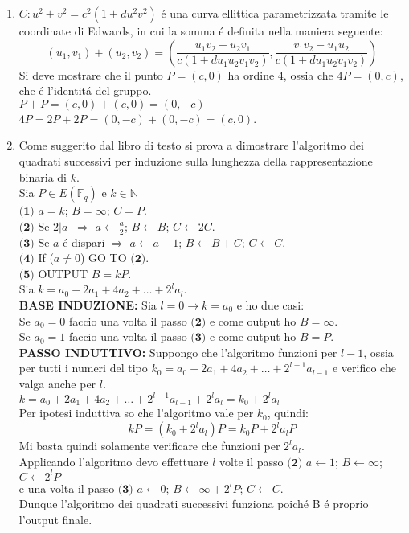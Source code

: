 \documentclass[a4paper]{article}
\newcommand{\ds}{\displaystyle}
\begin{document}
\begin{enumerate}
\item $C: u^2+v^2=c^2(1+du^2v^2)$ \'e una curva ellittica parametrizzata tramite le coordinate di Edwards, in cui la somma \'e definita nella maniera seguente:
$$(u_1,v_1)+(u_2,v_2)=\ds{\left(\frac{u_1 v_2+u_2 v_1}{c(1+du_1 u_2 v_1 v_2)},
\frac{v_1 v_2 - u_1 u_2}{c(1+du_1 u_2 v_1 v_2)}\right)}$$
Si deve mostrare che il punto $P=(c,0)$ ha ordine $4$, ossia che $4P = (0,c)$, che \'e l'identit\'a del gruppo.\\
$P+P=(c,0)+(c,0)=(0,-c)$\\
$4P=2P+2P=(0,-c)+(0,-c)=(c,0)$.





\item Come suggerito dal libro di testo si prova a dimostrare l'algoritmo dei quadrati successivi per induzione sulla lunghezza della rappresentazione binaria di $k$.\\
Sia $P\in E(\mathbb{F}_q)$ e $k\in \mathbb{N}$\\
$\textbf{(1)}$ $a=k$; $B=\infty$; $C=P$.\\
$\textbf{(2)}$ Se $2|a\;\;\Rightarrow$ $a \leftarrow \frac{a}{2}$; $B\leftarrow B$; $C\leftarrow 2C$.\\
$\textbf{(3)}$ Se $a$ \'e dispari $\Rightarrow$ $a \leftarrow a-1$; $B\leftarrow B+C$; $C\leftarrow C$.\\
$\textbf{(4)}$ If ($a\neq 0$) GO TO $\textbf{(2)}$.\\
$\textbf{(5)}$ OUTPUT $B=kP$.\\
Sia $k=a_0+2a_1+4a_2+\ldots+2^l a_l$.\\
\textbf{BASE INDUZIONE:} Sia $l=0 \rightarrow k=a_0$ e ho due casi:\\
Se $a_0 = 0$ faccio una volta il passo $\textbf{(2)}$ e come output ho $B=\infty$.\\
Se $a_0 = 1$ faccio una volta il passo $\textbf{(3)}$ e come output ho $B=P$. \\
\textbf{PASSO INDUTTIVO:} Suppongo che l'algoritmo funzioni per $l-1$, ossia per tutti i numeri del tipo  
$k_0 = a_0+2a_1+4a_2+\ldots+2^{l-1} a_{l-1}$ e verifico che valga anche per $l$.\\
$k=a_0+2a_1+4a_2+\ldots+2^{l-1} a_{l-1}+2^l a_l = k_0 +2^l a_l$\\
Per ipotesi induttiva so che l'algoritmo vale per $k_0$, quindi:\\
$$kP = (k_0 + 2^l a_l) P = k_0 P + 2^l a_l P$$
Mi basta quindi solamente verificare che funzioni per $2^l a_l$.\\
Applicando l'algoritmo devo effettuare $l$ volte il passo $\textbf{(2)}$
$a \leftarrow 1 $; $B\leftarrow \infty$; $C\leftarrow 2^l P$\\
e una volta il passo $\textbf{(3)}$
$a \leftarrow 0$; $B\leftarrow \infty+2^l P$; $C\leftarrow C$.\\	
Dunque l'algoritmo dei quadrati successivi funziona poich\'e B \'e proprio l'output finale.







\end{enumerate}
\end{document}
